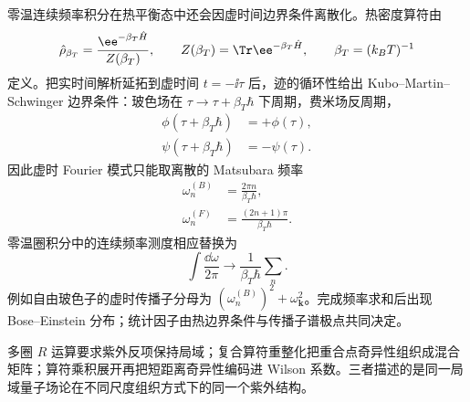 零温连续频率积分在热平衡态中还会因虚时间边界条件离散化。热密度算符由
\begin{equation*}
 \hat\rho_{\beta_T}=\frac{\ee^{-\beta_T\hat H}}{Z(\beta_T)},
 \qquad Z(\beta_T)=\Tr \ee^{-\beta_T\hat H},
 \qquad \beta_T=(k_BT)^{-1}
\end{equation*}
定义。把实时间解析延拓到虚时间 $t=-\ii\tau$ 后，迹的循环性给出 Kubo--Martin--Schwinger 边界条件：玻色场在 $\tau\to\tau+\beta_T\hbar$ 下周期，费米场反周期，
\begin{align}
 \phi(\tau+\beta_T\hbar)&=+\phi(\tau),\\
 \psi(\tau+\beta_T\hbar)&=-\psi(\tau).
 \label{eq:matsubara-boundary-dp11}
\end{align}
因此虚时 Fourier 模式只能取离散的 Matsubara 频率
\begin{equation}
 \boxed{
 \begin{aligned}
 \omega_n^{(B)}&=\frac{2\pi n}{\beta_T\hbar},\\
 \omega_n^{(F)}&=\frac{(2n+1)\pi}{\beta_T\hbar}.
 \end{aligned}}
 \label{eq:matsubara-frequencies-dp11}
\end{equation}
零温圈积分中的连续频率测度相应替换为
\begin{equation}
 \boxed{
 \int\frac{\dd\omega}{2\pi}
 \longrightarrow
 \frac1{\beta_T\hbar}\sum_n.}
 \label{eq:matsubara-loop-replacement-dp11}
\end{equation}
例如自由玻色子的虚时传播子分母为 $(\omega_n^{(B)})^2+\omega_{\mathbf k}^2$。完成频率求和后出现 Bose--Einstein 分布；统计因子由热边界条件与传播子谱极点共同决定。



多圈 $R$ 运算要求紫外反项保持局域；复合算符重整化把重合点奇异性组织成混合矩阵；算符乘积展开再把短距离奇异性编码进 Wilson 系数。三者描述的是同一局域量子场论在不同尺度组织方式下的同一个紫外结构。

